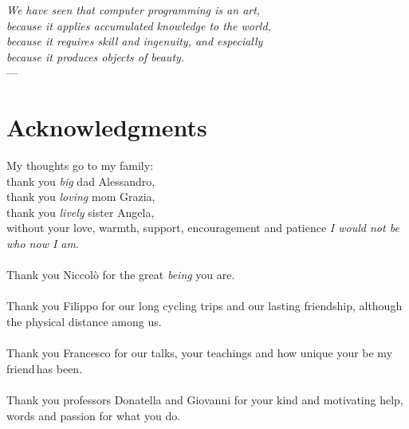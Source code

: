 
\begin{flushright}{\slshape    
    We have seen that computer programming is an art, \\ 
    because it applies accumulated knowledge to the world, \\ 
    because it requires skill and ingenuity, and especially \\
    because it produces objects of beauty.} \\ \medskip
    ---  \citep{knuth:1974}
\end{flushright}



\bigskip

\begingroup
\let\clearpage\relax
\let\cleardoublepage\relax
\let\cleardoublepage\relax

\chapter*{Acknowledgments}

My thoughts go to my family: \\
\indent thank you \emph{big} dad Alessandro, \\
\indent thank you \emph{loving} mom Grazia,\\
\indent thank you  \emph{lively} sister Angela, \\
without your love, warmth, support, encouragement 
and patience \emph{I would not be who now I am}.
\\\\
Thank you Niccol\`o for the great \emph{being} you are.
\\\\
Thank you Filippo for our long cycling trips and our lasting
friendship, although the physical distance among us.
\\\\
Thank you Francesco for our talks,
your teachings and how unique your \flqq be my friend\frqq\,has been.
\\\\
Thank you professors Donatella and Giovanni for your kind and motivating help,
words and passion for what you do.

